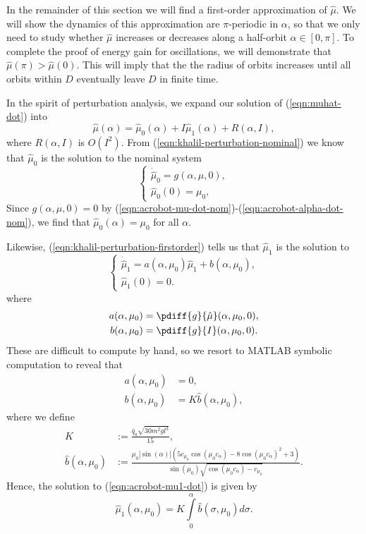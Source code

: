 In the remainder of this section we will find a first-order
approximation of \(\hat{\mu}\). 
We will show the dynamics of this approximation are \(\pi\)-periodic in
\(\alpha\), so that we only need to study whether \(\hat{\mu}\) increases or
decreases along a half-orbit \(\alpha \in [0,\pi]\).
To complete the proof of energy gain for oscillations, we will demonstrate that
\(\hat{\mu}(\pi) > \hat{\mu}(0)\).
This will imply that the the radius of orbits increases
until all orbits within \(D\) eventually leave \(D\) in finite time.

In the spirit of perturbation analysis, we expand our solution of
(\ref{eqn:muhat-dot}) into
\begin{equation}\label{eqn:acrobot-muhat-approx}
    \hat{\mu}(\alpha) = \hat{\mu}_0(\alpha) + I \hat{\mu}_1(\alpha)
    + R(\alpha,I)
    ,
\end{equation}
where \(R(\alpha,I)\) is \(O(I^2)\).
From (\ref{eqn:khalil-perturbation-nominal}) we know that 
\(\hat{\mu}_0\) is the solution to the nominal system
\[
\begin{cases}
    \dot{\hat{\mu}}_0 = g(\alpha,\mu,0)
    , \\
    \hat{\mu}_0(0) = \mu_0
    ,
\end{cases}
\]
Since \(g(\alpha,\mu,0) = 0\) by 
(\ref{eqn:acrobot-mu-dot-nom})-(\ref{eqn:acrobot-alpha-dot-nom}), we find that
\(\hat{\mu}_0(\alpha) = \mu_0\) for all \(\alpha\).

Likewise, (\ref{eqn:khalil-perturbation-firstorder}) tells us that 
\(\hat{\mu}_1\) is the solution to
\begin{equation}\label{eqn:acrobot-mu1-dot}
    \begin{cases}
        \dot{\hat{\mu}}_1 = a(\alpha,\mu_0)\hat{\mu}_1 + b(\alpha,\mu_0)
        , \\
        \hat{\mu}_1(0) = 0
        .
    \end{cases}
\end{equation}
where
\begin{align*}
    a(\alpha,\mu_0) &= \pdiff{g}{\hat{\mu}}(\alpha,\mu_0,0)
    , \\
    b(\alpha, \mu_0) &= \pdiff{g}{I}(\alpha, \mu_0, 0)
    .
\end{align*}
These are difficult to compute by hand, so we resort to MATLAB symbolic
computation to reveal that
\begin{align*}
    a(\alpha,\mu_0) &= 0
    , \\
    b(\alpha,\mu_0) &= K \hat{b}(\alpha,\mu_0)
    ,
\end{align*}
where we define
\begin{align*}
    K &:= \frac{\bar{q}_a \sqrt{30m^2g l^3}}{15}
    , \\
    \hat{b}(\alpha,\mu_0) &:= \frac{
        \mu_0 |\sin(\alpha)| \left(
        5 c_{\mu_0} \cos(\mu_0 c_\alpha) - 8 \cos(\mu_0c_\alpha)^2 + 3
    \right)
    }{
    \sin(\mu_0)\sqrt{\cos(\mu_0c_\alpha) - c_{\mu_0}}
    }
    .
\end{align*}
Hence, the solution to (\ref{eqn:acrobot-mu1-dot}) is given by
\[
    \hat{\mu}_1(\alpha,\mu_0) =
    K \int \limits_0^\alpha \hat{b}(\sigma,\mu_0)d\sigma
    .
\]


